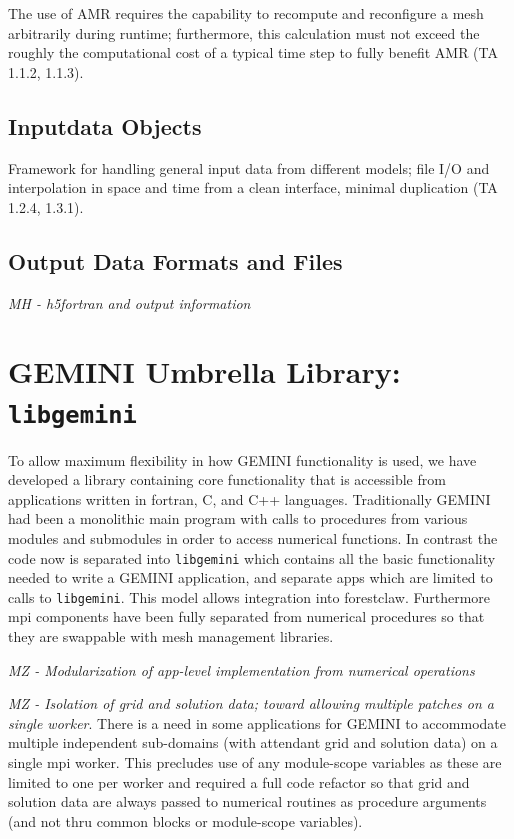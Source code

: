 \documentclass[11pt,letterpaper]{article}
\begin{document}
The use of AMR requires the capability to recompute and reconfigure a mesh arbitrarily during runtime; furthermore, this calculation must not exceed the roughly the computational cost of a typical time step to fully benefit AMR (TA 1.1.2, 1.1.3).  

\subsection{Inputdata Objects}

Framework for handling general input data from different models; file I/O and interpolation in space and time from a clean interface, minimal duplication (TA 1.2.4, 1.3.1).


\subsection{Output Data Formats and Files}

\emph{MH - h5fortran and output information}


\section{GEMINI Umbrella Library:  \texttt{libgemini}}

To allow maximum flexibility in how GEMINI functionality is used, we have developed a library containing core functionality that is accessible from applications written in fortran, C, and C++ languages.  Traditionally GEMINI had been a monolithic main program with calls to procedures from various modules and submodules in order to access numerical functions.  In contrast the code now is separated into \texttt{libgemini} which contains all the basic functionality needed to write a GEMINI application, and separate apps which are limited to calls to \texttt{libgemini}.  This model allows integration into forestclaw.  Furthermore mpi components have been fully separated from numerical procedures so that they are swappable with mesh management libraries.  

\emph{MZ - Modularization of app-level implementation from numerical operations}

\emph{MZ - Isolation of grid and solution data; toward allowing multiple patches on a single worker}.  There is a need in some applications for GEMINI to accommodate multiple independent sub-domains (with attendant grid and solution data) on a single mpi worker.  This precludes use of any module-scope variables as these are limited to one per worker and required a full code refactor so that grid and solution data are always passed to numerical routines as procedure arguments (and not thru common blocks or module-scope variables).  
\end{document}
